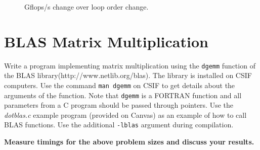 \documentclass[12pt]{article}
\begin{document}
\begin{figure}[t]
  \centering
  \caption{Gflops/s change over loop order change.}
\end{figure}

\section{BLAS Matrix Multiplication}
Write a program implementing matrix multiplication using the  \lstinline$dgemm$ function of the BLAS library(http://www.netlib.org/blas). The library is installed on CSIF computers.  Use the command  \lstinline$man dgemm$ on CSIF to get details about the arguments of the function. Note that  \lstinline$dgemm$ is a FORTRAN function and all parameters from a C program should be passed through pointers. Use the \textit{dotblas.c} example program (provided on Canvas) as an example of how to call BLAS functions. Use the additional \lstinline$-lblas$ argument during compilation.

\textbf{Measure timings for the above problem sizes and discuss your results.}
\end{document}
